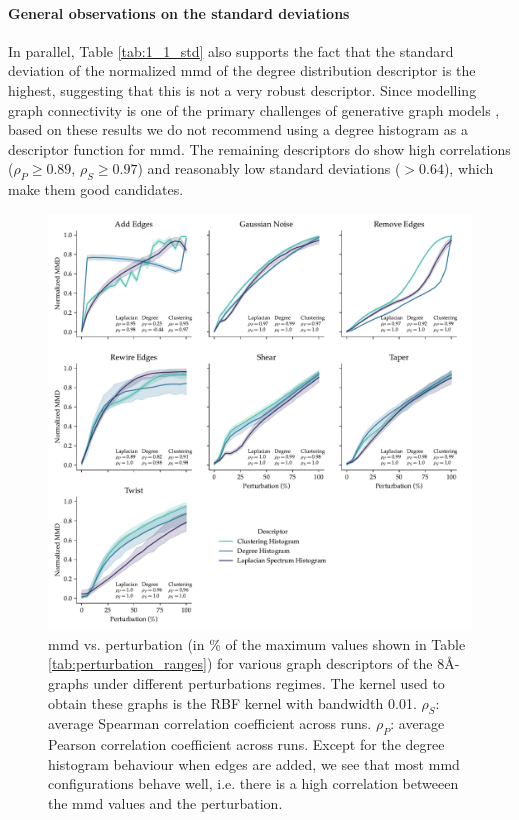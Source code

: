 \paragraph{General observations on the standard deviations} In parallel, Table
\ref{tab:1_1_std} also supports the fact that the standard deviation of the
normalized \acrshort{mmd} of the degree distribution descriptor is the highest,
suggesting that this is not a very robust descriptor. Since modelling graph
connectivity is one of the primary challenges of generative graph models
\citep{li2018learning}, based on these results we do not recommend using a
degree histogram as a descriptor function for \acrshort{mmd}. The remaining
descriptors do show high correlations ($\rho_P\geq 0.89$, $\rho_S\geq 0.97$) and
reasonably low standard deviations ($>0.64$), which make them good candidates.

\begin{figure}[!htbp]
  \centering
  \includegraphics[width=\textwidth]{./figures/results/res_1_1.pdf}
  \caption[Overall behaviour of \acrshort{mmd} using graph-based
descriptors.]{\acrshort{mmd} vs. perturbation (in \% of the maximum values shown
  in Table \ref{tab:perturbation_ranges}) for various graph
descriptors of the 8\si{\angstrom}-graphs under different perturbations regimes.
The kernel used to obtain these graphs is the RBF kernel with bandwidth 0.01.
$\rho_{S}$: average Spearman correlation coefficient across runs. $\rho_{P}$:
average Pearson correlation coefficient across runs. Except for the degree
histogram behaviour when edges are added, we see that most \acrshort{mmd}
configurations behave well, i.e. there is a high correlation betweeen the
\acrshort{mmd} values and the perturbation.}
  \label{fig:mmd_consistent_eps}
\end{figure}

